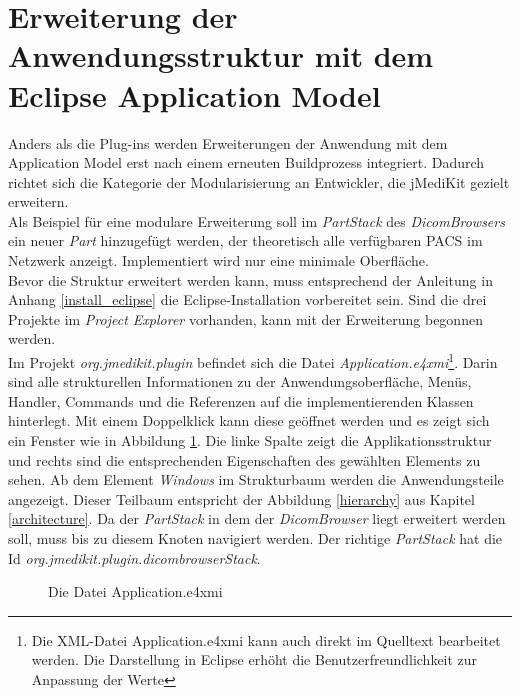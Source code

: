 \FloatBarrier
\section{Erweiterung der Anwendungsstruktur mit dem Eclipse Application Model}
Anders als die Plug-ins werden Erweiterungen der Anwendung mit dem Application Model erst nach einem erneuten Buildprozess integriert. Dadurch richtet sich die Kategorie der Modularisierung an Entwickler, die jMediKit gezielt erweitern.\\
Als Beispiel für eine modulare Erweiterung soll im \textit{PartStack} des \textit{DicomBrowsers} ein neuer \textit{Part} hinzugefügt werden, der theoretisch alle verfügbaren PACS im Netzwerk anzeigt. Implementiert wird nur eine minimale Oberfläche.\\
Bevor die Struktur erweitert werden kann, muss entsprechend der Anleitung in Anhang \ref{install_eclipse} die Eclipse-Installation vorbereitet sein. Sind die drei Projekte im \textit{Project Explorer} vorhanden, kann mit der Erweiterung begonnen werden.\\
Im Projekt \textit{org.jmedikit.plugin} befindet sich die Datei \textit{Application.e4xmi}\footnote{Die XML-Datei Application.e4xmi kann auch direkt im Quelltext bearbeitet werden. Die Darstellung in Eclipse erhöht die Benutzerfreundlichkeit zur Anpassung der Werte}. Darin sind alle strukturellen Informationen zu der Anwendungsoberfläche, Menüs, Handler, Commands und die Referenzen auf die implementierenden Klassen hinterlegt. Mit einem Doppelklick kann diese geöffnet werden und es zeigt sich ein Fenster wie in Abbildung \ref{e4xmi}. Die linke Spalte zeigt die Applikationsstruktur und rechts sind die entsprechenden Eigenschaften des gewählten Elements zu sehen. Ab dem Element \textit{Windows} im Strukturbaum werden die Anwendungsteile angezeigt. Dieser Teilbaum entspricht der Abbildung \ref{hierarchy} aus Kapitel \ref{architecture}. Da der \textit{PartStack} in dem der \textit{DicomBrowser} liegt erweitert werden soll, muss bis zu diesem Knoten navigiert werden. Der richtige \textit{PartStack} hat die Id \textit{org.jmedikit.plugin.dicombrowserStack}.
\begin{figure}[H]
  \vspace{0.5cm}
  \centering
   \caption{Die Datei Application.e4xmi}
  \label{e4xmi}
  \vspace{0.5cm}
\end{figure}

